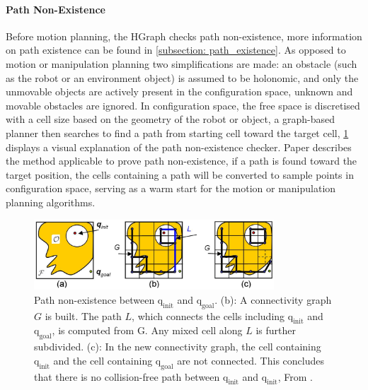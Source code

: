 \paragraph{Path Non-Existence}
Before motion planning, the HGraph checks path non-existence, more information on path existence can be found in \cref{subsection: path_existence}. As opposed to motion or manipulation planning two simplifications are made: an obstacle (such as the robot or an environment object) is assumed to be holonomic, and only the unmovable objects are actively present in the configuration space, unknown and movable obstacles are ignored. In configuration space, the free space is discretised with a cell size based on the geometry of the robot or object, a graph-based planner then searches to find a path from starting cell toward the target cell, \cref{figure: path_existence_cite} displays a visual explanation of the path non-existence checker. Paper \cite{akella_simple_2008} describes the method applicable to prove path non-existence, if a path is found toward the target position, the cells containing a path will be converted to sample points in configuration space, serving as a warm start for the motion or manipulation planning algorithms. \\

\begin{figure}[H]
    \centering
    \includegraphics[width=0.8\textwidth]{figures/path_existance_cite.png}
    \caption{Path non-existence between $\text{q}_\text{init}$ and $\text{q}_\text{goal}$. (b): A connectivity graph $G$ is built. The path $L$, which connects the cells including $\text{q}_\text{init}$ and $\text{q}_\text{goal}$, is computed from G. Any mixed cell along $L$ is further subdivided. (c): In the new connectivity graph, the cell containing  $\text{q}_\text{init}$ and the cell containing  $\text{q}_\text{goal}$ are not connected. This concludes that there is no collision-free path between $\text{q}_\text{init}$ and $\text{q}_\text{init}$, From \cite{akella_simple_2008}.}
    \label{figure: path_existence_cite}
\end{figure}

